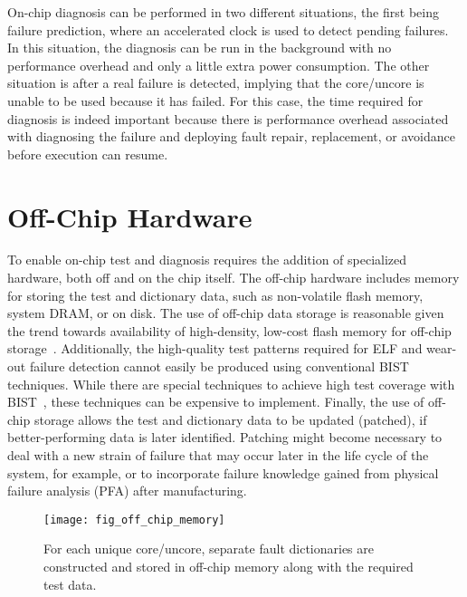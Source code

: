 On-chip diagnosis can be performed in two different situations, the first being failure prediction, where an accelerated clock is used to detect pending failures.
%
In this situation, the diagnosis can be run in the background with no performance overhead and only a little extra power consumption.
%
The other situation is after a real failure is detected, implying that the core/uncore is unable to be used because it has failed.
%
For this case, the time required for diagnosis is indeed important because there is performance overhead associated with diagnosing the failure and deploying fault repair, replacement, or avoidance before execution can resume.


\section{Off-Chip Hardware}
\label{sec:diag_off_chip_hw}

To enable on-chip test and diagnosis requires the addition of specialized hardware, both off and on the chip itself.
%
The off-chip hardware includes memory for storing the test and dictionary data, such as non-volatile flash memory, system DRAM, or on disk.
%
The use of off-chip data storage is reasonable given the trend towards availability of high-density, low-cost flash memory for off-chip storage~\cite{li08}.
%
Additionally, the high-quality test patterns required for ELF and wear-out failure detection cannot easily be produced using conventional BIST techniques.
%
While there are special techniques to achieve high test coverage with BIST~\cite{touba96,wunderlich96}, these techniques can be expensive to implement.
%
Finally, the use of off-chip storage allows the test and dictionary data to be updated (patched), if better-performing data is later identified.
%
Patching might become necessary to deal with a new strain of failure that may occur later in the life cycle of the system, for example, or to incorporate failure knowledge gained from physical failure analysis (PFA) after manufacturing.

\begin{figure}[hbtp]
\centering
\texttt{[image: fig\_off\_chip\_memory]}
\caption{For each unique core/uncore, separate fault dictionaries are constructed and stored in off-chip memory along with the required test data.}
\label{fig:diag_off_chip_memory}
\end{figure}

